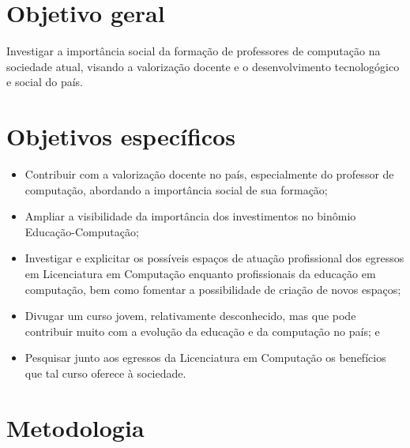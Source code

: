 \section{Objetivo geral}%

Investigar a importância social da formação de professores de computação na sociedade atual, visando a valorização docente e o desenvolvimento tecnologógico e social do país.


\section{Objetivos específicos}%

\begin{itemize}
	\item Contribuir com a valorização docente no país, especialmente do professor de computação, abordando a importância social de sua formação;
	\item Ampliar a visibilidade da importância dos investimentos no binômio Educação-Computação;
	\item Investigar e explicitar os possíveis espaços de atuação profissional dos egressos em Licenciatura em Computação enquanto profissionais da educação em computação, bem como fomentar a possibilidade de criação de novos espaços; 
	\item Divugar um curso jovem, relativamente desconhecido, mas que pode contribuir muito com a evolução da educação e da computação no país; e
	\item Pesquisar junto aos egressos da Licenciatura em Computação os benefícios que tal curso oferece à sociedade.
\end{itemize}


\section{Metodologia}%

